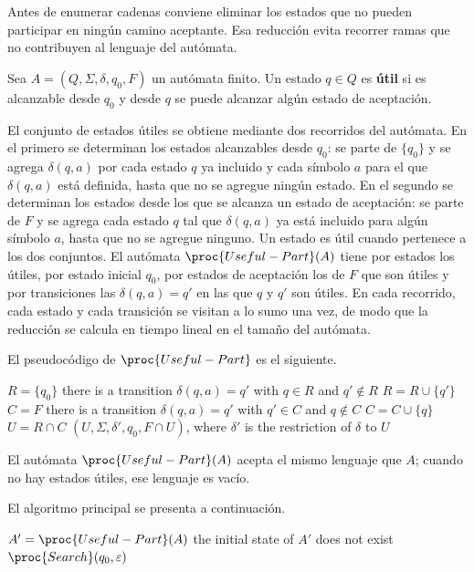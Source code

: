 Antes de enumerar cadenas conviene eliminar los estados que no pueden
participar en ningún camino aceptante. Esa reducción evita recorrer
ramas que no contribuyen al lenguaje del autómata.

\begin{definicion}
Sea $A=(Q,\Sigma,\delta,q_0,F)$ un autómata finito. Un estado $q\in Q$
es \textbf{útil} si es alcanzable desde $q_0$ y desde
$q$ se puede alcanzar algún estado de aceptación.
\end{definicion}

El conjunto de estados útiles se obtiene mediante dos recorridos del
autómata. En el primero se determinan los estados alcanzables desde
$q_0$: se parte de $\{q_0\}$ y se agrega $\delta(q,a)$ por cada estado
$q$ ya incluido y cada símbolo $a$ para el que $\delta(q,a)$ está
definida, hasta que no se agregue ningún estado. En el segundo se
determinan los estados desde los que se alcanza un estado de aceptación:
se parte de $F$ y se agrega cada estado $q$ tal que $\delta(q,a)$ ya
está incluido para algún símbolo $a$, hasta que no se agregue ninguno.
Un estado es útil cuando pertenece a los dos conjuntos. El autómata
$\proc{Useful-Part}(A)$ tiene por estados los útiles, por estado inicial
$q_0$, por estados de aceptación los de $F$ que son útiles y por
transiciones las $\delta(q,a)=q'$ en las que $q$ y $q'$ son útiles. En
cada recorrido, cada estado y cada transición se visitan a lo sumo una
vez, de modo que la reducción se calcula en tiempo lineal en el tamaño
del autómata.

El pseudocódigo de $\proc{Useful-Part}$ es el siguiente.

\begin{codebox}
\li $R = \{q_0\}$
\li \While there is a transition $\delta(q,a)=q'$ with $q \in R$ and $q' \notin R$
\li \Do $R = R \cup \{q'\}$
    \End
\li $C = F$
\li \While there is a transition $\delta(q,a)=q'$ with $q' \in C$ and $q \notin C$
\li \Do $C = C \cup \{q\}$
    \End
\li $U = R \cap C$
\li \Return $(U, \Sigma, \delta', q_0, F \cap U)$, where $\delta'$ is the
    restriction of $\delta$ to $U$
\end{codebox}

El autómata $\proc{Useful-Part}(A)$ acepta el mismo lenguaje que $A$;
cuando no hay estados útiles, ese lenguaje es vacío.

El algoritmo principal se presenta a continuación.

\begin{codebox}
\li $A' = \proc{Useful-Part}(A)$
\li \If the initial state of $A'$ does not exist
\li \Then \Return {}
    \End
\li \Return $\proc{Search}(q_0,\varepsilon)$
\end{codebox}

